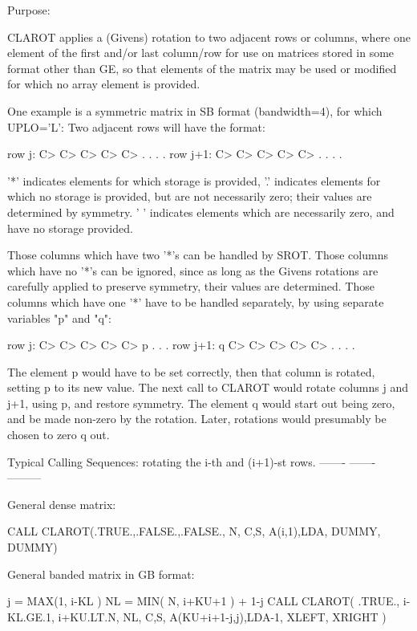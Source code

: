 \begin{DoxyParagraph}{Purpose\+: }
\begin{DoxyVerb}    CLAROT applies a (Givens) rotation to two adjacent rows or
    columns, where one element of the first and/or last column/row
    for use on matrices stored in some format other than GE, so
    that elements of the matrix may be used or modified for which
    no array element is provided.

    One example is a symmetric matrix in SB format (bandwidth=4), for
    which UPLO='L':  Two adjacent rows will have the format:

    row j:     C> C> C> C> C> .  .  .  .
    row j+1:      C> C> C> C> C> .  .  .  .

    '*' indicates elements for which storage is provided,
    '.' indicates elements for which no storage is provided, but
    are not necessarily zero; their values are determined by
    symmetry.  ' ' indicates elements which are necessarily zero,
     and have no storage provided.

    Those columns which have two '*'s can be handled by SROT.
    Those columns which have no '*'s can be ignored, since as long
    as the Givens rotations are carefully applied to preserve
    symmetry, their values are determined.
    Those columns which have one '*' have to be handled separately,
    by using separate variables "p" and "q":

    row j:     C> C> C> C> C> p  .  .  .
    row j+1:   q  C> C> C> C> C> .  .  .  .

    The element p would have to be set correctly, then that column
    is rotated, setting p to its new value.  The next call to
    CLAROT would rotate columns j and j+1, using p, and restore
    symmetry.  The element q would start out being zero, and be
    made non-zero by the rotation.  Later, rotations would presumably
    be chosen to zero q out.

    Typical Calling Sequences: rotating the i-th and (i+1)-st rows.
    ------- ------- ---------

      General dense matrix:

              CALL CLAROT(.TRUE.,.FALSE.,.FALSE., N, C,S,
                      A(i,1),LDA, DUMMY, DUMMY)

      General banded matrix in GB format:

              j = MAX(1, i-KL )
              NL = MIN( N, i+KU+1 ) + 1-j
              CALL CLAROT( .TRUE., i-KL.GE.1, i+KU.LT.N, NL, C,S,
                      A(KU+i+1-j,j),LDA-1, XLEFT, XRIGHT )


\end{DoxyVerb}
\end{DoxyParagraph}
